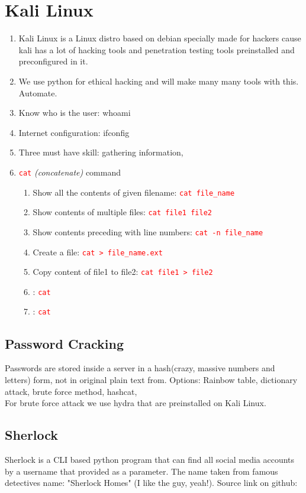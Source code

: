 \documentclass[12 pt, letterpaper]{extarticle}
\newcommand{\R}{\textcolor{red}} %
\newcommand{\T}{\texttt}
\begin{document}
\begin{enumerate}
\end{enumerate}

\section*{Kali Linux}
\begin{enumerate}
	\item Kali Linux is a Linux distro based on debian specially made for hackers cause kali has a lot of hacking tools and penetration testing tools preinstalled and preconfigured in it.
	\item We use python for ethical hacking and will make many many tools with this. Automate.
	\item Know who is the user: whoami
	\item Internet configuration: ifconfig
	\item Three must have skill: gathering information, 	
	
	\item \R{\T{cat}} \textit{(concatenate)} command
		\begin{enumerate}
			\item Show all the contents of given  filename: \R{\T{cat file\_name}}
			\item Show contents of multiple files: \R{\T{cat file1 file2}}
			\item Show contents preceding with line numbers: \R{\T{cat -n file\_name}}
			\item Create a file: \R{\T{cat > file\_name.ext}}
			\item Copy content of file1 to file2: \R{\T{cat file1 > file2}}
			\item : \R{\T{cat }}
			\item : \R{\T{cat }}
		\end{enumerate}
\end{enumerate}

\subsection{Password Cracking}
Passwords are stored inside a server in a hash(crazy, massive numbers and letters) form, not in original plain text from.
Options: Rainbow table, dictionary attack, brute force method, hashcat, \\
For brute force attack we use hydra that are preinstalled on Kali Linux.

\subsection*{Sherlock}
Sherlock is a CLI based python program that can find all social media accounts by a username that provided as a parameter. The name taken from famous detectives name: "Sherlock Homes" (I like the guy, yeah!). Source link on github: %
\end{document}
